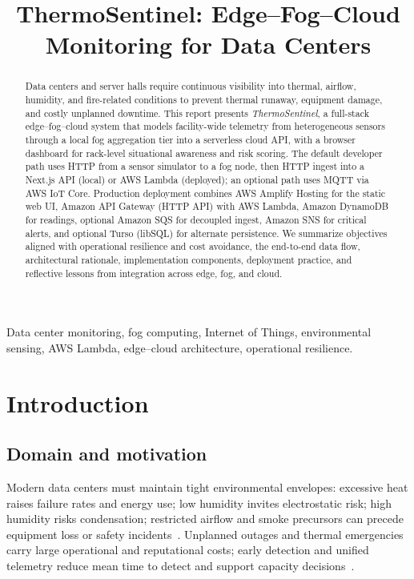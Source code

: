\documentclass[conference]{IEEEtran}
\begin{document}
\title{ThermoSentinel: Edge--Fog--Cloud Monitoring for Data Centers}

\author{
}

\maketitle

\begin{abstract}
Data centers and server halls require continuous visibility into thermal, airflow, humidity, and fire-related conditions to prevent thermal runaway, equipment damage, and costly unplanned downtime. This report presents \emph{ThermoSentinel}, a full-stack edge--fog--cloud system that models facility-wide telemetry from heterogeneous sensors through a local fog aggregation tier into a serverless cloud API, with a browser dashboard for rack-level situational awareness and risk scoring. The default developer path uses HTTP from a sensor simulator to a fog node, then HTTP ingest into a Next.js API (local) or AWS Lambda (deployed); an optional path uses MQTT via AWS IoT Core. Production deployment combines AWS Amplify Hosting for the static web UI, Amazon API Gateway (HTTP API) with AWS Lambda, Amazon DynamoDB for readings, optional Amazon SQS for decoupled ingest, Amazon SNS for critical alerts, and optional Turso (libSQL) for alternate persistence. We summarize objectives aligned with operational resilience and cost avoidance, the end-to-end data flow, architectural rationale, implementation components, deployment practice, and reflective lessons from integration across edge, fog, and cloud.
\end{abstract}

\begin{IEEEkeywords}
Data center monitoring, fog computing, Internet of Things, environmental sensing, AWS Lambda, edge--cloud architecture, operational resilience.
\end{IEEEkeywords}

\section{Introduction}

\subsection{Domain and motivation}
Modern data centers must maintain tight environmental envelopes: excessive heat raises failure rates and energy use; low humidity invites electrostatic risk; high humidity risks condensation; restricted airflow and smoke precursors can precede equipment loss or safety incidents~\cite{buyya2016fog}. Unplanned outages and thermal emergencies carry large operational and reputational costs; early detection and unified telemetry reduce mean time to detect and support capacity decisions~\cite{armbrust2010cloud}.
\end{document}

